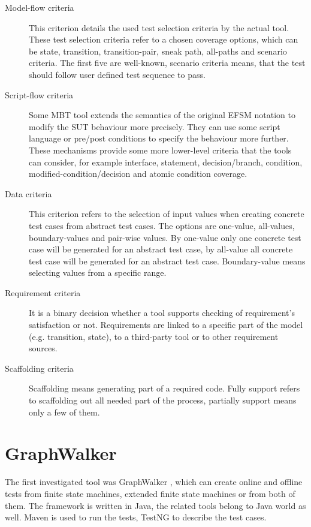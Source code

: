 \begin{description}
	\item[Model-flow criteria] This criterion details the used test selection criteria by the actual tool. These test selection criteria refer to a chosen coverage options, which can be state, transition, transition-pair, sneak path, all-paths and scenario criteria. The first five are well-known, scenario criteria means, that the test should follow user defined test sequence to pass.
	\item[Script-flow criteria] Some MBT tool extends the semantics of the original EFSM notation to modify the SUT behaviour more precisely. They can use some script language or pre/post conditions to specify the behaviour more further. These mechanisms provide some more lower-level criteria that the tools can consider, for example interface, statement, decision/branch, condition, modified-condition/decision and atomic condition coverage.
	\item[Data criteria] This criterion refers to the selection of input values when creating concrete test cases from abstract test cases. The options are one-value, all-values, boundary-values and pair-wise values. By one-value only one concrete test case will be generated for an abstract test case, by all-value all concrete test case will be generated for an abstract test case. Boundary-value means selecting values from a specific range.
	\item[Requirement criteria] It is a binary decision whether a tool supports checking of requirement's satisfaction or not. Requirements are linked to a specific part of the model (e.g. transition, state), to a third-party tool or to other requirement sources.
	\item[Scaffolding criteria] Scaffolding means generating part of a required code. Fully support refers to scaffolding out all needed part of the process, partially support means only a few of them.
\end{description}

\section{GraphWalker}
\label{sec:graphwalker}

The first investigated tool was GraphWalker \cite{graphwalker}, which can create online and offline tests from finite state machines, extended finite state machines or from both of them. The framework is written in Java, the related tools belong to Java world as well. Maven is used to run the tests, TestNG to describe the test cases.

